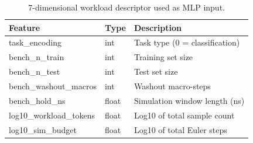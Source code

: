 \documentclass{article}
\begin{document}
\begin{table}[h]
  \centering
  \caption{7-dimensional workload descriptor used as MLP input.}
  \label{tab:features}
  \begin{tabular}{lll}
    \toprule
    Feature & Type & Description \\
    \midrule
    task\_encoding         & int   & Task type (0 = classification) \\
    bench\_n\_train        & int   & Training set size \\
    bench\_n\_test         & int   & Test set size \\
    bench\_washout\_macros & int   & Washout macro-steps \\
    bench\_hold\_ns        & float & Simulation window length (ns) \\
    log10\_workload\_tokens & float & Log10 of total sample count \\
    log10\_sim\_budget     & float & Log10 of total Euler steps \\
    \bottomrule
  \end{tabular}
\end{table}
\end{document}
